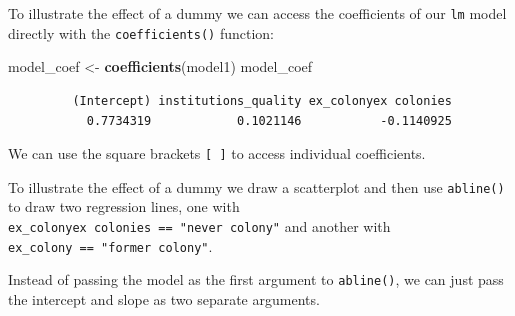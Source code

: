 \documentclass[]{article}
\newenvironment{Shaded}{\begin{snugshade}}{\end{snugshade}}
\newcommand{\KeywordTok}[1]{\textcolor[rgb]{0.13,0.29,0.53}{\textbf{#1}}}
\newcommand{\StringTok}[1]{\textcolor[rgb]{0.31,0.60,0.02}{#1}}
\newcommand{\NormalTok}[1]{#1}
\theoremstyle{definition}
\theoremstyle{definition}
\theoremstyle{definition}
\theoremstyle{remark}
\begin{document}
To illustrate the effect of a dummy we can access the coefficients of
our \texttt{lm} model directly with the \texttt{coefficients()}
function:

\begin{Shaded}
\begin{Highlighting}[]
\NormalTok{model_coef <-}\StringTok{ }\KeywordTok{coefficients}\NormalTok{(model1)}
\NormalTok{model_coef}
\end{Highlighting}
\end{Shaded}

\begin{verbatim}
         (Intercept) institutions_quality ex_colonyex colonies 
           0.7734319            0.1021146           -0.1140925 
\end{verbatim}

We can use the square brackets \texttt{{[}\ {]}} to access individual
coefficients.

To illustrate the effect of a dummy we draw a scatterplot and then use
\texttt{abline()} to draw two regression lines, one with
\texttt{ex\_colonyex\ colonies\ ==\ "never\ colony"} and another with
\texttt{ex\_colony\ ==\ "former\ colony"}.

Instead of passing the model as the first argument to \texttt{abline()},
we can just pass the intercept and slope as two separate arguments.
\end{document}
